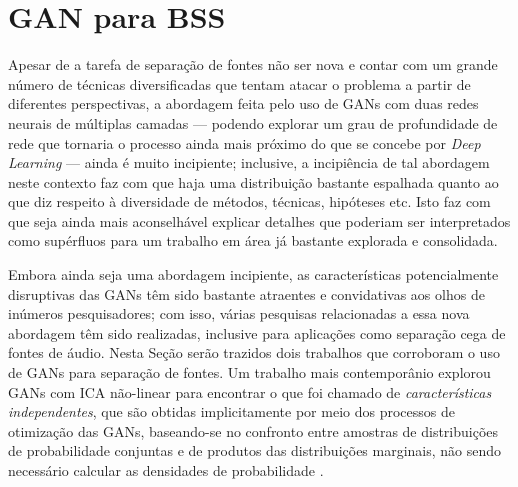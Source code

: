 \chapter{GAN para BSS}
\label{cha:gan_for_bss}

Apesar de a tarefa de separação de fontes não ser nova e contar com um grande número de técnicas diversificadas que tentam atacar o problema a partir de diferentes perspectivas, a abordagem feita pelo uso de GANs com duas redes neurais de múltiplas camadas --- podendo explorar um grau de profundidade de rede que tornaria o processo ainda mais próximo do que se concebe por \textit{Deep Learning} --- ainda é muito incipiente; inclusive, a incipiência de tal abordagem neste contexto faz com que haja uma distribuição bastante espalhada quanto ao que diz respeito à diversidade de métodos, técnicas, hipóteses etc. Isto faz com que seja ainda mais aconselhável explicar detalhes que poderiam ser interpretados como supérfluos para um trabalho em área já bastante explorada e consolidada.





Embora ainda seja uma abordagem incipiente, as características potencialmente disruptivas das GANs têm sido bastante atraentes e convidativas aos olhos de inúmeros pesquisadores; com isso, várias pesquisas relacionadas a essa nova abordagem têm sido realizadas, inclusive para aplicações como separação cega de fontes de áudio. Nesta Seção serão trazidos dois trabalhos que corroboram o uso de GANs para separação de fontes. Um trabalho mais contemporânio explorou GANs com ICA não-linear para encontrar o que foi chamado de \textit{características independentes}, que são obtidas implicitamente por meio dos processos de otimização das GANs, baseando-se no confronto entre amostras de distribuições de probabilidade conjuntas e de produtos das distribuições marginais, não sendo necessário calcular as densidades de probabilidade \citep{brakel2017learning}.

